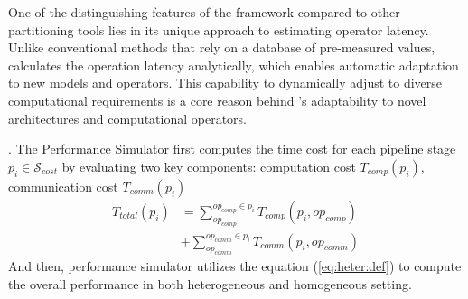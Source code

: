 One of the distinguishing features of the \sysname framework compared to other partitioning tools lies in its unique approach to estimating operator latency. 
Unlike conventional methods that rely on a database of pre-measured values, \sysname calculates the operation latency analytically, which enables automatic adaptation to new models and operators. 
This capability to dynamically adjust to diverse computational requirements is a core reason behind \sysname’s adaptability to novel architectures and computational operators.







. 
The Performance Simulator first computes the time cost for each pipeline stage $p_i \in \mathcal{S}_{cost}$ by evaluating two key components: 
computation cost $T_{comp}(p_i)$, communication cost $T_{comm}(p_i)$
\begin{align}
    T_{total}(p_i) &= \sum^{op_{comp}\in p_i}_{op_{comp}}T_{comp}(p_i, op_{comp}) 
    \\
    &+ \sum^{op_{comm}\in p_i}_{op_{comm}}T_{comm}(p_i, op_{comm})
\end{align}
And then, performance simulator utilizes the equation (\ref{eq:heter:def}) to compute the overall performance in both heterogeneous and homogeneous setting.


